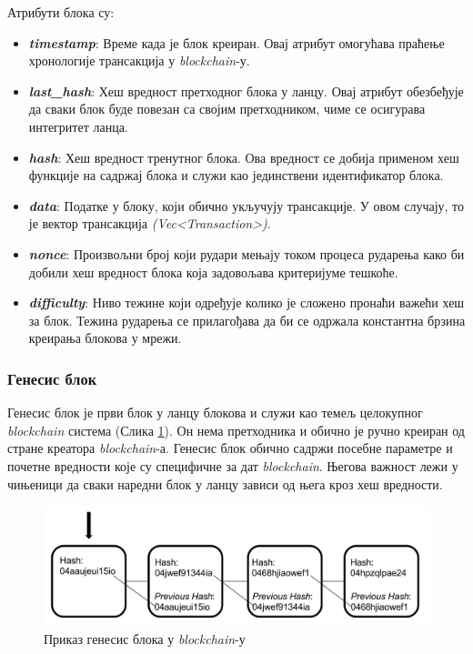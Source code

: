 \documentclass[12pt, a4paper]{article}
\begin{document}
Атрибути блока су:
\begin{itemize}
    \item \textbf{\textit{timestamp}}: Време када је блок креиран. Овај атрибут омогућава праћење хронологије трансакција у \textit{blockchain}-у.
    \item \textbf{\textit{last\_hash}}: Хеш вредност претходног блока у ланцу. Овај атрибут обезбеђује да сваки блок буде повезан са својим претходником, чиме се осигурава интегритет ланца.
    \item \textbf{\textit{hash}}: Хеш вредност тренутног блока. Ова вредност се добија применом хеш функције на садржај блока и служи као јединствени идентификатор блока.
    \item \textbf{\textit{data}}: Податке у блоку, који обично укључују трансакције. У овом случају, то је вектор трансакција \textit{(Vec<Transaction>)}.
    \item \textbf{\textit{nonce}}: Произвољни број који рудари мењају током процеса рударења како би добили хеш вредност блока која задовољава критеријуме тешкоће.
    \item \textbf{\textit{difficulty}}: Ниво тежине који одређује колико је сложено пронаћи важећи хеш за блок. Тежина рударења се прилагођава да би се одржала константна брзина креирања блокова у мрежи.
\end{itemize}



\subsubsection{Генесис блок}
Генесис блок је први блок у ланцу блокова и служи као темељ целокупног \textit{blockchain} система (Слика \ref{fig:genesis-block}). Он нема претходника и обично је ручно креиран од стране креатора \textit{blockchain}-а. Генесис блок обично садржи посебне параметре и почетне вредности које су специфичне за дат \textit{blockchain}. Његова важност лежи у чињеници да сваки наредни блок у ланцу зависи од њега кроз хеш вредности.

\begin{figure}[h]
    \centering
    \includegraphics[width=1\linewidth]{slike/genesis.png}
    \caption{Приказ генесис блока у \textit{blockchain}-у}
    \label{fig:genesis-block}
\end{figure}
\end{document}
